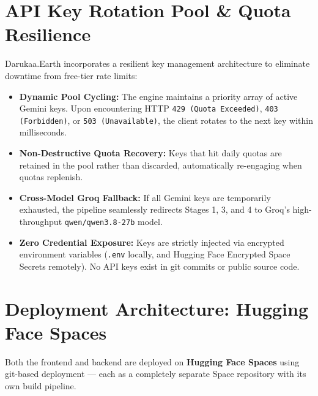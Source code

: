 \documentclass[11pt,a4paper]{article}
\begin{document}
\section{API Key Rotation Pool \& Quota Resilience}

Darukaa.Earth incorporates a resilient key management architecture to eliminate downtime from free-tier rate limits:
\begin{itemize}[itemsep=3pt]
    \item \textbf{Dynamic Pool Cycling:} The engine maintains a priority array of active Gemini keys. Upon encountering HTTP \texttt{429 (Quota Exceeded)}, \texttt{403 (Forbidden)}, or \texttt{503 (Unavailable)}, the client rotates to the next key within milliseconds.
    \item \textbf{Non-Destructive Quota Recovery:} Keys that hit daily quotas are retained in the pool rather than discarded, automatically re-engaging when quotas replenish.
    \item \textbf{Cross-Model Groq Fallback:} If all Gemini keys are temporarily exhausted, the pipeline seamlessly redirects Stages 1, 3, and 4 to Groq's high-throughput \texttt{qwen/qwen3.8-27b} model.
    \item \textbf{Zero Credential Exposure:} Keys are strictly injected via encrypted environment variables (\texttt{.env} locally, and Hugging Face Encrypted Space Secrets remotely). No API keys exist in git commits or public source code.
\end{itemize}

\section{Deployment Architecture: Hugging Face Spaces}


Both the frontend and backend are deployed on \textbf{Hugging Face Spaces} using git-based deployment — each as a completely separate Space repository with its own build pipeline.
\end{document}
